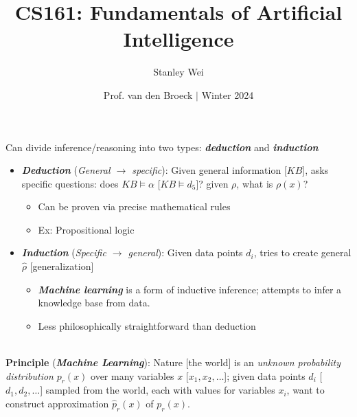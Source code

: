 \documentclass[12pt]{extarticle}
\title{CS161: Fundamentals of Artificial Intelligence}
\author{Stanley Wei}
\date{Prof. van den Broeck $\vert$ Winter 2024}
\theoremstyle{definition}
\theoremstyle{remark}
\newcommand{\pstart}[0]{\noindent}
\newcommand{\newp}[0]{~\\ \pstart}
\newcommand{\term}[1]{\noindent\textbf{\textit{#1}}}
\begin{document}
Can divide inference/reasoning into two types: \term{deduction} and \term{induction}\begin{itemize}
    \item \term{Deduction} (\textit{General $\to$ specific}): Given general information [$KB$], asks specific questions: does $KB\models\alpha$ [$KB\models d_5$]? given $\rho$, what is $\rho(x)$?  \begin{itemize}
        \item Can be proven via precise mathematical rules
        \item Ex: Propositional logic
    \end{itemize}
    \item \term{Induction} (\textit{Specific $\to$ general}): Given data points $d_i$, tries to create general $\hat{\rho}$ [generalization] \begin{itemize}
        \item \term{Machine learning} is a form of inductive inference; attempts to infer a knowledge base from data.
        \item Less philosophically straightforward than deduction
    \end{itemize}
\end{itemize}

\newp
\textbf{Principle} (\term{Machine Learning}): Nature [the world] is an \textit{unknown probability distribution} $p_r(x)$ over many variables $x$ [$x_1,x_2,\hdots$]; given data points $d_i$ [$d_1,d_2,\hdots$] sampled from the world, each with values for variables $x_i$, want to construct approximation $\hat{p}_r(x)$ of $p_r(x)$.
\end{document}
